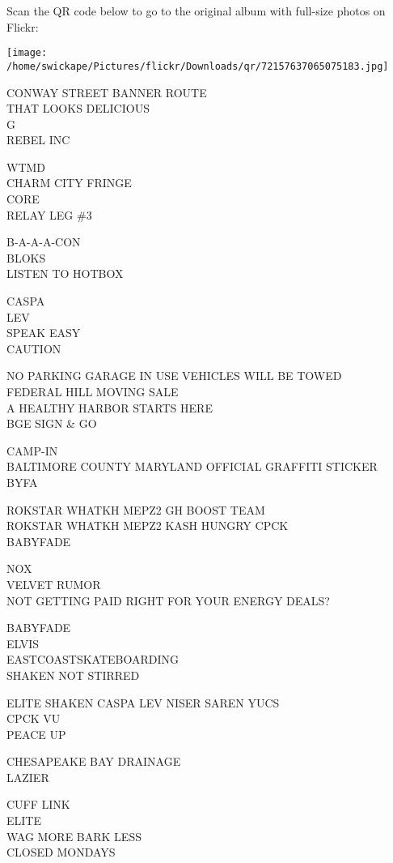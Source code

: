 \documentclass[10pt,letterpaper]{article}
\begin{document}
Scan the QR code below to go to the original album with full-size photos on Flickr:

\texttt{[image: /home/swickape/Pictures/flickr/Downloads/qr/72157637065075183.jpg]}


CONWAY STREET BANNER ROUTE\\
THAT LOOKS DELICIOUS\\
G\\
REBEL INC

WTMD\\
CHARM CITY FRINGE\\
CORE\\
RELAY LEG \#3

B{-}A{-}A{-}A{-}CON\\
BLOKS\\
LISTEN TO HOTBOX

CASPA\\
LEV\\
SPEAK EASY\\
CAUTION

NO PARKING GARAGE IN USE VEHICLES WILL BE TOWED\\
FEDERAL HILL MOVING SALE\\
A HEALTHY HARBOR STARTS HERE\\
BGE SIGN \& GO

CAMP{-}IN\\
BALTIMORE COUNTY MARYLAND OFFICIAL GRAFFITI STICKER\\
BYFA

ROKSTAR WHATKH MEPZ2 GH BOOST TEAM\\
ROKSTAR WHATKH MEPZ2 KASH HUNGRY CPCK\\
BABYFADE

NOX\\
VELVET RUMOR\\
NOT GETTING PAID RIGHT FOR YOUR ENERGY DEALS?

BABYFADE\\
ELVIS\\
EASTCOASTSKATEBOARDING\\
SHAKEN NOT STIRRED

ELITE SHAKEN CASPA LEV NISER SAREN YUCS\\
CPCK VU\\
PEACE UP

CHESAPEAKE BAY DRAINAGE\\
LAZIER

CUFF LINK\\
ELITE\\
WAG MORE BARK LESS\\
CLOSED MONDAYS
\end{document}
